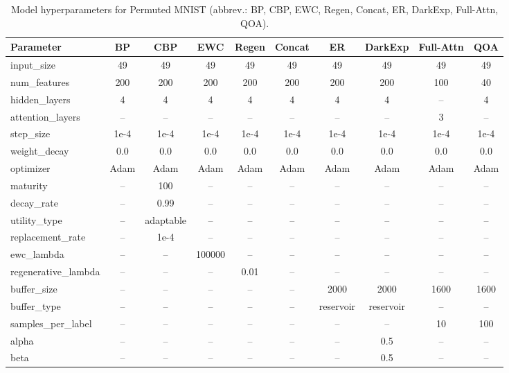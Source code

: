 \documentclass{article}
\begin{document}
\begin{table}[!ht]
\setlength{\abovecaptionskip}{0pt}
\setlength{\belowcaptionskip}{2pt}

\caption{Model hyperparameters for Permuted MNIST (abbrev.: BP, CBP, EWC, Regen, Concat, ER, DarkExp, Full-Attn, QOA).}
\label{tab:pmnist_model_specs}

\centering
\scriptsize
\setlength{\tabcolsep}{2pt}

\begin{tabular}{lccccccccc}
\toprule
\textbf{Parameter} & \textbf{BP} & \textbf{CBP} & \textbf{EWC} & \textbf{Regen} & \textbf{Concat} & \textbf{ER} & \textbf{DarkExp} & \textbf{Full-Attn} & \textbf{QOA} \\
\midrule
input\_size            & 49 & 49 & 49 & 49 & 49 & 49 & 49 & 49 & 49 \\
num\_features          & 200 & 200 & 200 & 200 & 200 & 200 & 200 & 100 & 40 \\
hidden\_layers         & 4 & 4 & 4 & 4 & 4 & 4 & 4 & -- & 4 \\
attention\_layers      & -- & -- & -- & -- & -- & -- & -- & 3 & -- \\
step\_size             & 1e-4 & 1e-4 & 1e-4 & 1e-4 & 1e-4 & 1e-4 & 1e-4 & 1e-4 & 1e-4 \\
weight\_decay          & 0.0 & 0.0 & 0.0 & 0.0 & 0.0 & 0.0 & 0.0 & 0.0 & 0.0 \\
optimizer              & Adam & Adam & Adam & Adam & Adam & Adam & Adam & Adam & Adam \\
\midrule
maturity               & -- & 100 & -- & -- & -- & -- & -- & -- & -- \\
decay\_rate            & -- & 0.99 & -- & -- & -- & -- & -- & -- & -- \\
utility\_type          & -- & adaptable & -- & -- & -- & -- & -- & -- & -- \\
replacement\_rate      & -- & 1e-4 & -- & -- & -- & -- & -- & -- & -- \\
\midrule
ewc\_lambda            & -- & -- & 100000 & -- & -- & -- & -- & -- & -- \\
regenerative\_lambda   & -- & -- & -- & 0.01 & -- & -- & -- & -- & -- \\
\midrule
buffer\_size           & -- & -- & -- & -- & -- & 2000 & 2000 & 1600 & 1600 \\
buffer\_type           & -- & -- & -- & -- & -- & reservoir & reservoir & -- & -- \\
samples\_per\_label    & -- & -- & -- & -- & -- & -- & -- & 10 & 100 \\
\midrule
alpha                  & -- & -- & -- & -- & -- & -- & 0.5 & -- & -- \\
beta                   & -- & -- & -- & -- & -- & -- & 0.5 & -- & -- \\
\bottomrule
\end{tabular}

\end{table}
\end{document}
